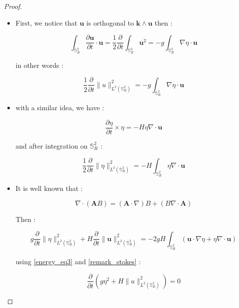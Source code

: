 \documentclass[10pt,a4paper]{amsart}
\def\gint{\displaystyle\int}
\begin{document}
\begin{proof}
\begin{itemize}
\item First, we notice that $\mathbf{u}$ is orthogonal to $\mathbf{k} \wedge \mathbf{u}$ then :

$$\gint_{\mathbb{S}_R^2} \dfrac{\partial \mathbf{u}}{\partial t} \cdot \mathbf{u} = \dfrac{1}{2} \dfrac{\partial}{\partial t} \gint_{\mathbb{S}_R^2} \mathbf{u}^2 = -g \gint_{\mathbb{S}_R^2} \nabla \eta \cdot \mathbf{u}$$

in other words :

\begin{equation}
\dfrac{1}{2} \dfrac{\partial}{\partial t} \| u \|_{L^2(\mathbb{S}_R^2)}^2 = -g \gint_{\mathbb{S}_R^2} \nabla \eta \cdot \mathbf{u}
\label{energy_eq1}
\end{equation}

\item with a similar idea, we have :

$$\dfrac{\partial \eta}{\partial t} \times \eta = -H \eta \nabla \cdot \mathbf{u} $$

and after integration on $\mathbb{S}_R^2$ :

\begin{equation}
\dfrac{1}{2} \dfrac{\partial}{\partial t} \| \eta \|^2_{L^2(\mathbb{S}_R^2)} = -H \gint_{\mathbb{S}_R^2} \eta \nabla \cdot \mathbf{u}
\label{energy_eq2}
\end{equation}

\item It is well known that :

\begin{equation}
\nabla \cdot \left( \mathbf{A} B \right) = \left( \mathbf{A} \cdot \nabla \right) B + \left( B \nabla \cdot \mathbf{A} \right)
\label{energy_eq3}
\end{equation}

Then :

$$g \dfrac{\partial}{\partial t}  \| \eta \|^2_{L^2(\mathbb{S}_R^2)} + H \dfrac{\partial}{\partial t} \| \mathbf{u} \|^2_{L^2(\mathbb{S}_R^2)} = -2gH \gint_{\mathbb{S}_R^2} \left( \mathbf{u} \cdot \nabla \eta + \eta \nabla \cdot \mathbf{u} \right)$$

using \eqref{energy_eq3} and \ref{remark_stokes} :

\begin{equation}
\dfrac{\partial}{\partial t} \left( g  \eta^2 + H \| u \|_{L^2(\mathbb{S}_R^2)}^2 \right) = 0
\end{equation}
\end{itemize}
\end{proof}
\end{document}
